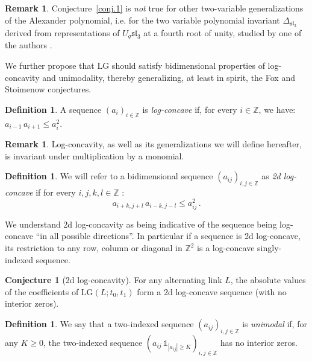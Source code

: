 \documentclass[12pt,reqno]{amsart}
\theoremstyle{definition}
\newtheorem{definition}[theorem]{Definition}
\newtheorem{remark}[theorem]{Remark}
\newtheorem{conjecture}[theorem]{Conjecture}
\def\LG{\mathrm{LG}}
\newcommand{\ind}{\mathds{1}}
\newcommand{\slthree}{\mathfrak{sl}_3}
\begin{document}
\begin{remark}
    Conjecture~\ref{conj.1} is \emph{not} true for other two-variable generalizations of the Alexander polynomial, i.e. for the two variable polynomial invariant $\Delta_{\slthree}$ derived from representations of $U_q\mathfrak{sl}_3$ at a fourth root of unity, studied by one of the authors \cite[Figure 10]{Harper2020}.
\end{remark}

We further propose that $\LG$ should satisfy bidimensional properties of log-concavity and unimodality, thereby generalizing, at least in spirit, the Fox and Stoimenow conjectures.

\begin{definition}
A sequence $(a_{i})_{i \in \mathbb{Z}}$ is \emph{log-concave} if, for every \( i \in \mathbb{Z} \), we have: $a_{i-1} \, a_{i+1} \leq a_i^2$.
\end{definition}

\begin{remark}
    Log-concavity, as well as its generalizations we will define hereafter, is invariant under multiplication by a monomial.
\end{remark}

\begin{definition}
   We will refer to a bidimensional sequence $(a_{ij})_{i,j \in \mathbb{Z}}$ as \emph{2d log-concave} if for every $i,j,k,l \in \mathbb{Z}$ :
   $$a_{i+k,j+l} \, a_{i-k,j-l} \leq a_{ij}^2\,.$$
\end{definition}

We understand 2d log-concavity as being indicative of the sequence being log-concave ``in all possible directions''. In particular if a sequence is 2d log-concave, its restriction to any row, column or diagonal in $\mathbb{Z}^2$ is a log-concave singly-indexed sequence.

\begin{conjecture}[2d log-concavity]\label{conj.2}
For any alternating link $L$, the absolute values of the coefficients of $\LG(L ; t_0, t_1)$ form a 2d log-concave sequence (with no interior zeros).
\end{conjecture}

\begin{definition}
    We say that a two-indexed sequence $(a_{ij})_{i,j \in \mathbb{Z}}$ is \emph{unimodal} if, for any $K \geq 0$, the two-indexed sequence $(a_{ij} \, \ind_{|a_{ij}| \geq K})_{i,j \in \mathbb{Z}}$ has no interior zeros.
\end{definition}
\end{document}
